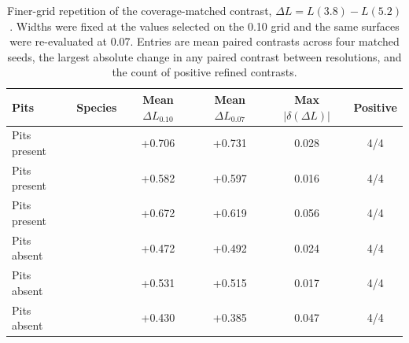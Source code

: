 \begin{table}[htbp]\centering\small
\caption{Finer-grid repetition of the coverage-matched contrast, $\Delta L=L(3.8)-L(5.2)$. Widths were fixed at the values selected on the \SI{0.10}{\micrometre} grid and the same surfaces were re-evaluated at \SI{0.07}{\micrometre}. Entries are mean paired contrasts across four matched seeds, the largest absolute change in any paired contrast between resolutions, and the count of positive refined contrasts.}
\label{tab:geomfine}
\begin{tabular}{llcccc}\toprule
Pits & Species & Mean $\Delta L_{0.10}$ & Mean $\Delta L_{0.07}$ & Max $|\delta(\Delta L)|$ & Positive\\\midrule
Pits present & \Ec{} & +0.706 & +0.731 & 0.028 & 4/4\\
Pits present & \Sa{} & +0.582 & +0.597 & 0.016 & 4/4\\
Pits present & \Pa{} & +0.672 & +0.619 & 0.056 & 4/4\\
Pits absent & \Ec{} & +0.472 & +0.492 & 0.024 & 4/4\\
Pits absent & \Sa{} & +0.531 & +0.515 & 0.017 & 4/4\\
Pits absent & \Pa{} & +0.430 & +0.385 & 0.047 & 4/4\\
\bottomrule\end{tabular}
\end{table}
